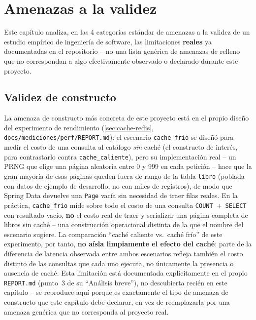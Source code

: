 \chapter{Amenazas a la validez}
\label{cap:amenazas-validez}

Este capítulo analiza, en las 4 categorías estándar de amenazas a la
validez de un estudio empírico de ingeniería de software, las
limitaciones \textbf{reales} ya documentadas en el repositorio -- no una
lista genérica de amenazas de relleno que no correspondan a algo
efectivamente observado o declarado durante este proyecto.

\section{Validez de constructo}

La amenaza de constructo más concreta de este proyecto está en el propio
diseño del experimento de rendimiento (\autoref{sec:cache-redis},
\texttt{docs/mediciones/perf/REPORT.md}): el escenario
\texttt{cache\_frio} se diseñó para medir el costo de una consulta al
catálogo \emph{sin} caché (el constructo de interés, para contrastarlo
contra \texttt{cache\_caliente}), pero su implementación real -- un PRNG
que elige una página aleatoria entre 0 y 999 en cada petición -- hace que
la gran mayoría de esas páginas queden fuera de rango de la tabla
\texttt{libro} (poblada con datos de ejemplo de desarrollo, no con miles
de registros), de modo que Spring Data devuelve una \texttt{Page} vacía
sin necesidad de traer filas reales. En la práctica,
\texttt{cache\_frio} mide sobre todo el costo de una consulta
\texttt{COUNT}~+~\texttt{SELECT} con resultado vacío, \textbf{no} el
costo real de traer y serializar una página completa de libros sin
caché -- una construcción operacional distinta de la que el nombre del
escenario sugiere. La comparación ``caché caliente vs.\ caché frío'' de
este experimento, por tanto, \textbf{no aísla limpiamente el efecto del
caché}: parte de la diferencia de latencia observada entre ambos
escenarios refleja también el costo distinto de las consultas que cada
uno ejecuta, no únicamente la presencia o ausencia de caché. Esta
limitación está documentada explícitamente en el propio
\texttt{REPORT.md} (punto~3 de su ``Análisis breve''), no descubierta
recién en este capítulo -- se reproduce aquí porque es exactamente el
tipo de amenaza de constructo que este capítulo debe declarar, en vez de
reemplazarla por una amenaza genérica que no corresponda al proyecto
real.

